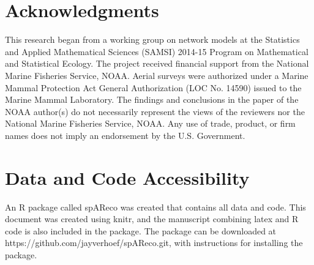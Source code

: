 \documentclass[11pt, titlepage]{article}\usepackage[]{graphicx}\usepackage[]{color}
\begin{document}
\begin{spacing}{1.9}
\begin{flushleft}
\section*{Acknowledgments} 

This research began from a working group on network models at the Statistics and Applied Mathematical Sciences (SAMSI) 2014-15 Program on Mathematical and Statistical Ecology. The project received financial support from the National Marine Fisheries Service, NOAA. Aerial surveys were authorized under a Marine Mammal Protection Act General Authorization (LOC No. 14590) issued to the Marine Mammal Laboratory. The findings and conclusions in the paper of the NOAA author(s) do not necessarily represent the views of the reviewers nor the National Marine Fisheries Service, NOAA. Any use of trade, product, or firm names does not imply an endorsement by the U.S. Government. 

\section*{Data and Code Accessibility}

An R package called spAReco was created that contains all data and code. This document was created using knitr, and the manuscript combining latex and R code is also included in the package.  The package can be downloaded at https://github.com/jayverhoef/spAReco.git, with instructions for installing the package.


%


%
%



\end{flushleft}
\end{spacing}
\end{document}
